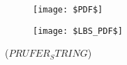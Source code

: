 
  \begin{figure}
    \centering
    \begin{subfigure}[b]{0.23\textwidth}
      \texttt{[image: \$PDF\$]}
    \end{subfigure}
    \qquad
    \begin{subfigure}[b]{0.17\textwidth}
      \texttt{[image: \$LBS\_PDF\$]}
    \end{subfigure}
    \caption*{\huge{($PRUFER_STRING$)}}
  \end{figure}
